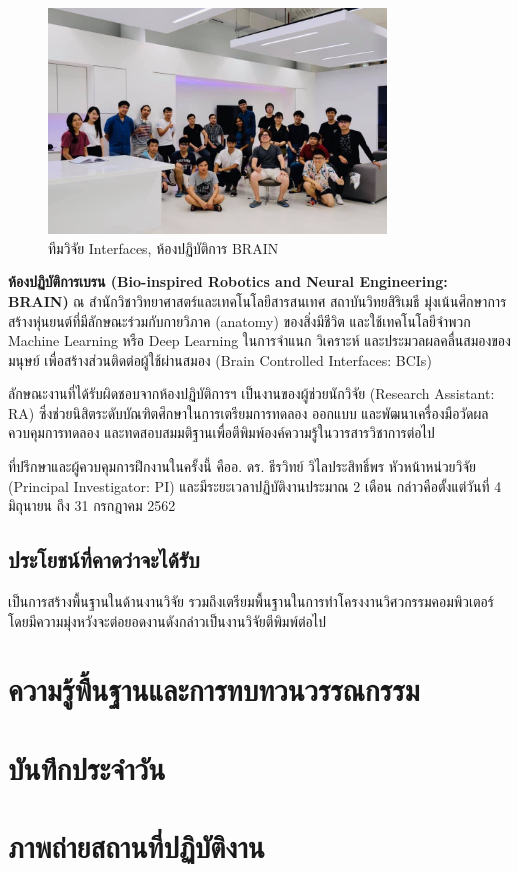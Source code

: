 \documentclass[16pt,a4]{internshipreport}
\begin{document}
\begin{figure}[H]
    \centering
    \includegraphics[width=0.8\textwidth]{images/brain_team_2019.jpg}
    \caption{ทีมวิจัย Interfaces, ห้องปฏิบัติการ BRAIN}
\end{figure}

\textbf{ห้องปฏิบัติการเบรน (Bio-inspired Robotics and Neural Engineering: BRAIN)}
ณ สำนักวิชาวิทยาศาสตร์และเทคโนโลยีสารสนเทศ สถาบันวิทยสิริเมธี มุ่งเน้นศึกษาการสร้างหุ่นยนต์ที่มีลักษณะร่วมกับกายวิภาค (anatomy) ของสิ่งมีชีวิต และใช้เทคโนโลยีจำพวก Machine Learning หรือ Deep Learning ในการจำแนก วิเคราะห์ และประมวลผลคลื่นสมองของมนุษย์ เพื่อสร้างส่วนติดต่อผู้ใช้ผ่านสมอง (Brain Controlled Interfaces: BCIs)

ลักษณะงานที่ได้รับผิดชอบจากห้องปฏิบัติการฯ เป็นงานของผู้ช่วยนักวิจัย (Research Assistant: RA) ซึ่งช่วยนิสิตระดับบัณฑิตศึกษาในการเตรียมการทดลอง ออกแบบ และพัฒนาเครื่องมือวัดผล ควบคุมการทดลอง และทดสอบสมมติฐานเพื่อตีพิมพ์องค์ความรู้ในวารสารวิชาการต่อไป

ที่ปรึกษาและผู้ควบคุมการฝึกงานในครั้งนี้ คืออ. ดร. ธีรวิทย์ วิไลประสิทธิ์พร หัวหน้าหน่วยวิจัย (Principal Investigator: PI) และมีระยะเวลาปฏิบัติงานประมาณ 2 เดือน กล่าวคือตั้งแต่วันที่ 4 มิถุนายน ถึง 31 กรกฎาคม 2562

\section{ประโยชน์ที่คาดว่าจะได้รับ}
เป็นการสร้างพื้นฐานในด้านงานวิจัย รวมถึงเตรียมพื้นฐานในการทำโครงงานวิศวกรรมคอมพิวเตอร์ โดยมีความมุ่งหวังจะต่อยอดงานดังกล่าวเป็นงานวิจัยตีพิมพ์ต่อไป

\chapter{ความรู้พื้นฐานและการทบทวนวรรณกรรม}




\begin{appendices}
\chapter{บันทึกประจำวัน}


\chapter{ภาพถ่ายสถานที่ปฏิบัติงาน}

\end{appendices}
\end{document}
